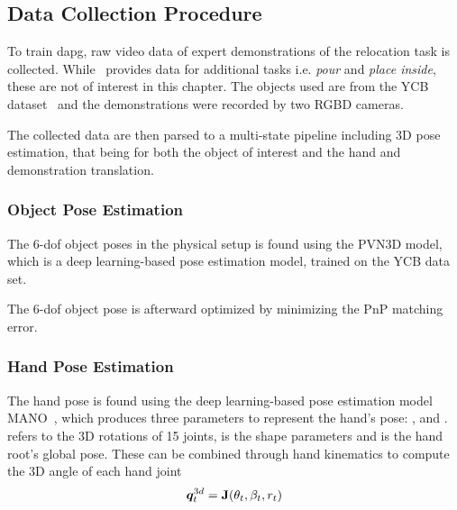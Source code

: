 \subsection{Data Collection Procedure}
To train \gls{dapg}, raw video data of expert demonstrations of the relocation task is collected. While~\cite{dexmv:-imitation-learning-for-dexterous-manipulation-from-human-videos} provides data for additional tasks i.e. \textit{pour} and \textit{place inside}, these are not of interest in this chapter. The objects used are from the YCB dataset~\cite{ycb} and the demonstrations were recorded by two RGBD cameras.\medskip

The collected data are then parsed to a multi-state pipeline including 3D pose estimation, that being for both the object of interest and the hand and demonstration translation.

\subsubsection{Object Pose Estimation}
The \num{6}-\gls{dof} object poses in the physical setup is found using the PVN3D model, which is a deep learning-based pose estimation model, trained on the YCB data set.\medskip

The \num{6}-\gls{dof} object pose is afterward optimized by minimizing the \gls{PnP} matching error.

\subsubsection{Hand Pose Estimation}

The hand pose is found using the deep learning-based pose estimation model MANO~\cite{mano}, which produces three parameters to represent the hand's pose: , and .  refers to the 3D rotations of \num{15} joints,  is the shape
parameters and  is the hand root's global pose. These can be combined through hand kinematics to compute the 3D angle of each hand joint
%
\begin{equation}
    \bm{q}^{3d}_t = \bm{\mathrm{J}}(\theta_t,\beta_t,r_t)
\end{equation}

